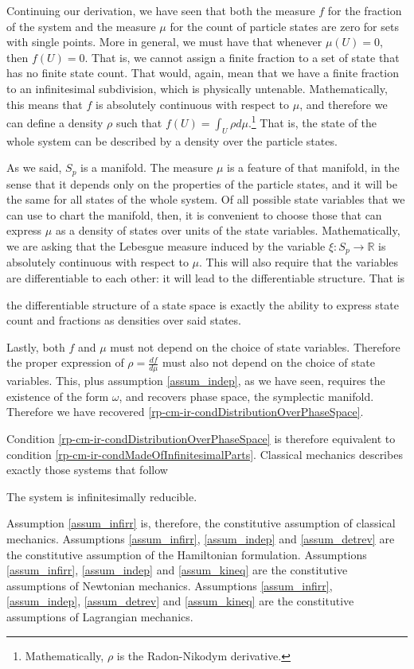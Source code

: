 Continuing our derivation, we have seen that both the measure $f$ for the fraction of the system and the measure $\mu$ for the count of particle states are zero for sets with single points. More in general, we must have that whenever $\mu(U) = 0$, then $f(U)=0$. That is, we cannot assign a finite fraction to a set of state that has no finite state count. That would, again, mean that we have a finite fraction to an infinitesimal subdivision, which is physically untenable. Mathematically, this means that $f$ is absolutely continuous with respect to $\mu$, and therefore we can define a density $\rho$ such that $f(U) = \int_U \rho d\mu$.\footnote{Mathematically, $\rho$ is the Radon-Nikodym derivative.} That is, the state of the whole system can be described by a density over the particle states.

As we said, $S_p$ is a manifold. The measure $\mu$ is a feature of that manifold, in the sense that it depends only on the properties of the particle states, and it will be the same for all states of the whole system. Of all possible state variables that we can use to chart the manifold, then, it is convenient to choose those that can express $\mu$ as a density of states over units of the state variables. Mathematically, we are asking that the Lebesgue measure induced by the variable $\xi : S_p \to \mathbb{R}$ is absolutely continuous with respect to $\mu$. This will also require that the variables are differentiable to each other: it will lead to the differentiable structure. That is
\begin{insight}
	the differentiable structure of a state space is exactly the ability to express state count and fractions as densities over said states.
\end{insight} 

Lastly, both $f$ and $\mu$ must not depend on the choice of state variables. Therefore the proper expression of $\rho = \frac{df}{d\mu}$ must also not depend on the choice of state variables. This, plus assumption \ref{assum_indep}, as we have seen, requires the existence of the form $\omega$, and recovers phase space, the symplectic manifold. Therefore we have recovered \ref{rp-cm-ir-condDistributionOverPhaseSpace}.

Condition \ref{rp-cm-ir-condDistributionOverPhaseSpace} is therefore equivalent to condition \ref{rp-cm-ir-condMadeOfInfinitesimalParts}. Classical mechanics describes exactly those systems that follow
\renewcommand{\theassump}{IR}
\begin{assump}\label{assum_infirr}
	The system is infinitesimally reducible.
\end{assump}
\renewcommand{\theassump}{\Roman{assump}}
Assumption \ref{assum_infirr} is, therefore, the constitutive assumption of classical mechanics. Assumptions \ref{assum_infirr}, \ref{assum_indep} and \ref{assum_detrev} are the constitutive assumption of the Hamiltonian formulation. Assumptions \ref{assum_infirr}, \ref{assum_indep} and \ref{assum_kineq} are the constitutive assumptions of Newtonian mechanics.  Assumptions \ref{assum_infirr}, \ref{assum_indep}, \ref{assum_detrev} and \ref{assum_kineq} are the constitutive assumptions of Lagrangian mechanics. 

